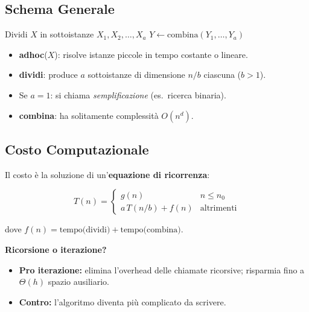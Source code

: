 \subsection{Schema Generale}

\begin{algorithm}[H]
	\caption{DivideEtImpera($X$)}
	Dividi $X$ in sottoistanze $X_1, X_2, \ldots, X_a$\;
	$Y \gets \text{combina}(Y_1, \ldots, Y_a)$\;
	\;
\end{algorithm}

\begin{softnote}
	\begin{itemize}
		\item \textbf{adhoc}($X$): risolve istanze piccole in tempo
		costante o lineare.
		\item \textbf{dividi}: produce $a$ sottoistanze di dimensione
		$n/b$ ciascuna ($b>1$).
		\item Se $a=1$: si chiama \textit{semplificazione} (es.\ ricerca binaria).
		\item \textbf{combina}: ha solitamente complessità $O(n^d)$.
	\end{itemize}
\end{softnote}

\subsection{Costo Computazionale}

Il costo è la soluzione di un'\textbf{equazione di ricorrenza}:

\[
T(n) =
\begin{cases}
	g(n)           & n \le n_0 \\
	a\,T(n/b)+f(n) & \text{altrimenti}
\end{cases}
\]

dove $f(n) = \text{tempo(dividi)} + \text{tempo(combina)}$.

\begin{nota}
	\textbf{Ricorsione o iterazione?}
	\begin{itemize}
		\item \textbf{Pro iterazione:} elimina l'overhead delle chiamate
		ricorsive; risparmia fino a $\Theta(h)$ spazio ausiliario.
		\item \textbf{Contro:} l'algoritmo diventa più complicato da scrivere.
	\end{itemize}
\end{nota}

